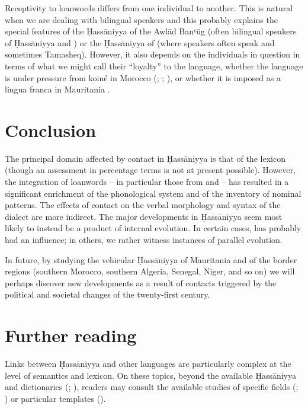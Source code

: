 \documentclass[output=paper]{langsci/langscibook}
\begin{document}

Receptivity to {loanwords} differs from one individual to another. This is natural when we are dealing with bilingual speakers and this probably explains the special features of the Ḥassāniyya of the Awlād Banʸūg (often bilingual speakers of Ḥassāniyya and ) or the Ḥassāniyya of  (where  speakers often speak  and sometimes Tamasheq). However, it also depends on the individuals in question in terms of what we might call their “loyalty” to the language, whether the language is under pressure from   koiné in Morocco (\citealt{Taine-Cheikh1997socio}; \citealt{Heath2002}; \citealt{Paciotti2017}), or whether it is imposed as a lingua franca in Mauritania \citep{Dia2007}.

\section{Conclusion} %

The principal domain affected by contact in Ḥassāniyya is that of the lexicon (though an assessment in percentage terms is not at present possible). However, the integration of {loanwords} – in particular those from   and  – has resulted in a significant enrichment of the phonological system and of the inventory of nominal patterns. The effects of contact on the verbal morphology and syntax of the dialect are more indirect. The major developments in Ḥassāniyya seem most likely to instead be a product of internal evolution. In certain cases,  has probably had an influence; in others, we rather witness instances of parallel evolution. 

In {future}, by studying the vehicular Ḥassāniyya of Mauritania and of the border regions (southern Morocco, southern Algeria, Senegal, Niger, and so on) we will perhaps discover new developments as a result of contacts triggered by the political and societal changes of the twenty-first century. 

\section*{Further reading}

Links between Ḥassāniyya and other languages are particularly complex at the level of semantics and lexicon. On these topics, beyond the available Ḥassāniyya and  dictionaries (\citealt{Heath2004}; \citealt{Taine-Cheikh1988dictionary,Taine-Cheikh2008dictionary}), readers may consult the available studies of specific fields (\citealt{Monteil1952}; \citealt{Taine-Cheikh2013}) or particular templates (\citealt{Taine-Cheikh2018quadri}).
\end{document}
